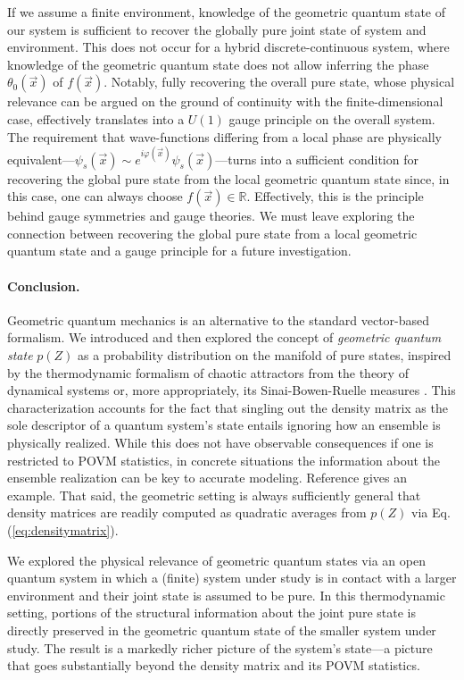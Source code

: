 \documentclass[draft,nofootinbib,pre,twocolumn,showpacs,showkeys,preprintnumbers,floatfix]{revtex4-1}
\newcommand{\1}{\mathbbm{1}}
\begin{document}
If we assume a finite environment, knowledge of the geometric quantum state of
our system is sufficient to recover the globally pure joint state of system and
environment. This does not occur for a hybrid discrete-continuous system, where
knowledge of the geometric quantum state does not allow inferring the phase
$\theta_0(\vec{x})$ of $f(\vec{x})$. Notably, fully recovering the overall pure
state, whose physical relevance can be argued on the ground of continuity with
the finite-dimensional case, effectively translates into a $U(1)$ gauge
principle on the overall system. The requirement that wave-functions differing 
from a local phase are physically equivalent---$\psi_s(\vec{x}) \sim
e^{i\varphi(\vec{x})}\psi_s(\vec{x})$---turns into a sufficient condition for
recovering the global pure state from the local geometric quantum state since, 
in this case, one can always choose $f(\vec{x}) \in \mathbb{R}$. Effectively, this is
the principle behind gauge symmetries and gauge theories. We must leave
exploring the connection between recovering the global pure state from a local
geometric quantum state and a gauge principle for a future investigation.

\paragraph*{Conclusion.}
Geometric quantum mechanics is an alternative to the standard vector-based
formalism. We introduced and then explored the concept of \emph{geometric
quantum state} $p(Z)$ as a probability distribution on the manifold of pure
states, inspired by the thermodynamic formalism of chaotic attractors from the
theory of dynamical systems or, more appropriately, its Sinai-Bowen-Ruelle
measures \cite{Eckmann1985}. This characterization accounts for the fact 
that singling out the density matrix as the sole descriptor of a quantum 
system's state entails ignoring how an ensemble is physically realized.
While this does not have observable consequences if one is restricted to POVM
statistics, in concrete situations the information about the ensemble
realization can be key to accurate modeling. Reference \cite{Anza20c} gives an
example. That said, the geometric setting is always sufficiently general
that density matrices are readily computed as quadratic averages from $p(Z)$
via Eq. (\ref{eq:densitymatrix}).

We explored the physical relevance of geometric quantum states via an open
quantum system in which a (finite) system under study is in contact with a
larger environment and their joint state is assumed to be pure. In this
thermodynamic setting, portions of the structural information about the joint
pure state is directly preserved in the geometric quantum state of the smaller
system under study. The result is a markedly richer picture of the system's
state---a picture that goes substantially beyond the density matrix and its
POVM statistics.
\end{document}
